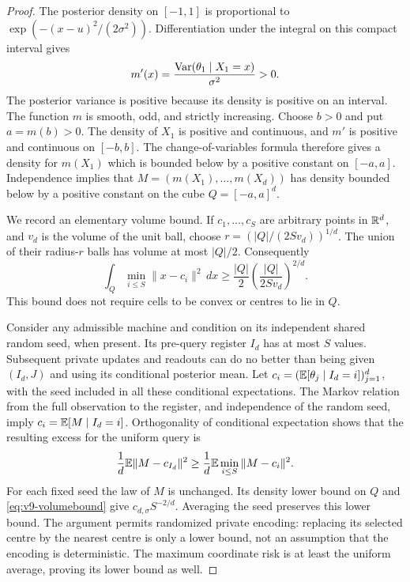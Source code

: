 \begin{proof}
The posterior density on $[-1,1]$ is proportional to
$\exp(-(x-u)^2/(2\sigma^2))$. Differentiation under the integral on this
compact interval gives
\begin{equation}
                     m'(x)=\frac{\operatorname{Var}(\theta_1\mid X_1=x)}{\sigma^2}>0.
 \label{eq:v9-posteriorderivative}
\end{equation}
The posterior variance is positive because its density is positive on
an interval. The function $m$ is smooth, odd, and strictly increasing.
Choose $b>0$ and put $a=m(b)>0$. The density of $X_1$ is positive and
continuous, and $m'$ is positive and continuous on $[-b,b]$. The
change-of-variables formula therefore gives a density for $m(X_1)$
which is bounded below by a positive constant on $[-a,a]$. Independence
implies that $M=(m(X_1),\ldots,m(X_d))$ has density bounded below by a
positive constant on the cube $Q=[-a,a]^d$.

We record an elementary volume bound. If $c_1,\ldots,c_S$ are arbitrary
points in $\mathbb R^d$, and $v_d$ is the volume of the unit ball, choose
$r=(|Q|/(2Sv_d))^{1/d}$. The union of their radius-$r$ balls has volume
at most $|Q|/2$. Consequently
\begin{equation}
 \int_Q\min_{i\le S}\|x-c_i\|^2\,dx
       \ge\frac{|Q|}{2}\left(\frac{|Q|}{2Sv_d}\right)^{2/d}.
 \label{eq:v9-volumebound}
\end{equation}
This bound does not require cells to be convex or centres to lie in $Q$.

Consider any admissible machine and condition on its independent shared
random seed, when present. Its pre-query register $I_d$ has at most
$S$ values. Subsequent private updates and readouts can do no better than
being given $(I_d,J)$ and using its conditional posterior mean. Let
$c_i=(\mathbb E[\theta_j\mid I_d=i])_{j=1}^d$, with the seed included in all
these conditional expectations. The Markov relation from the full
observation to the register, and independence of the random seed,
imply $c_i=\mathbb E[M\mid I_d=i]$. Orthogonality of conditional expectation
shows that the resulting excess for the uniform query is
\[
              \frac1d\mathbb E\|M-c_{I_d}\|^2
       \ge \frac1d\mathbb E\min_{i\le S}\|M-c_i\|^2.
\]
For each fixed seed the law of $M$ is unchanged. Its density lower bound
on $Q$ and \eqref{eq:v9-volumebound} give
$c_{d,\sigma}S^{-2/d}$. Averaging the seed preserves this lower bound.
The argument permits randomized private encoding: replacing its selected
centre by the nearest centre is only a lower bound, not an assumption
that the encoding is deterministic. The maximum coordinate risk is at
least the uniform average, proving its lower bound as well.


\end{proof}
